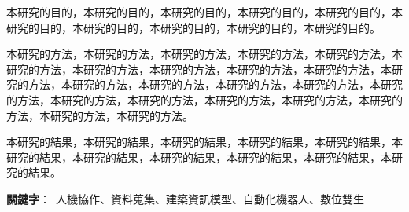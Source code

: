 本研究的目的，本研究的目的，本研究的目的，本研究的目的，本研究的目的，本研究的目的，本研究的目的，本研究的目的，本研究的目的，本研究的目的。

本研究的方法，本研究的方法，本研究的方法，本研究的方法，本研究的方法，本研究的方法，本研究的方法，本研究的方法，本研究的方法，本研究的方法，本研究的方法，本研究的方法，本研究的方法，本研究的方法，本研究的方法，本研究的方法，本研究的方法，本研究的方法，本研究的方法，本研究的方法，本研究的方法，本研究的方法，本研究的方法。

本研究的結果，本研究的結果，本研究的結果，本研究的結果，本研究的結果，本研究的結果，本研究的結果，本研究的結果，本研究的結果，本研究的結果，本研究的結果。

\begin{flushleft}
\mbox{{\bf 關鍵字}： 人機協作、資料蒐集、建築資訊模型、自動化機器人、數位雙生}
\end{flushleft}
